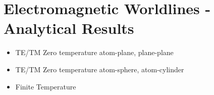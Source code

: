 \chapter{Electromagnetic Worldlines - Analytical Results}

    \begin{itemize}
    \item TE/TM Zero temperature atom-plane, plane-plane
    \item TE/TM Zero temperature atom-sphere, atom-cylinder
    \item Finite Temperature
    \end{itemize}

